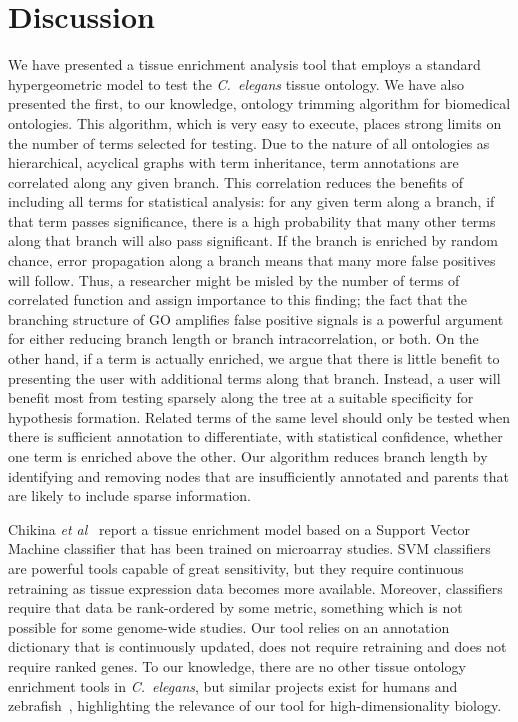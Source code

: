 \documentclass{bmcart}
\begin{document}
\section*{Discussion}
We have presented a tissue enrichment analysis tool that employs a standard hypergeometric model to test the \emph{C.~elegans} tissue ontology. We have also presented the first, to our knowledge, ontology trimming algorithm for biomedical ontologies. This algorithm, which is very easy to execute, places strong limits on the number of terms selected for testing. Due to the nature of all ontologies as hierarchical, acyclical graphs with term inheritance, term annotations are correlated along any given branch. This correlation reduces the benefits of including all terms for statistical analysis: for any given term along a branch, if that term passes significance, there is a high probability that many other terms along that branch will also pass significant. If the branch is enriched by random chance, error propagation along a branch means that many more false positives will follow. Thus, a researcher might be misled by the number of terms of correlated function and assign importance to this finding; the fact that the branching structure of GO amplifies false positive signals is a powerful argument for either reducing branch length or branch intracorrelation, or both. On the other hand, if a term is actually enriched, we argue that there is little benefit to presenting the user with additional terms along that branch. Instead, a user will benefit most from testing sparsely along the tree at a suitable specificity for hypothesis formation. Related terms of the same level should only be tested when there is sufficient annotation to differentiate, with statistical confidence, whether one term is enriched above the other. Our algorithm reduces branch length by identifying and removing nodes that are insufficiently annotated and parents that are likely to include sparse information.

Chikina \emph{et al}~\cite{Chikina2009} report a tissue enrichment model based on a Support Vector Machine classifier that has been trained on microarray studies. SVM classifiers are powerful tools capable of great sensitivity, but they require continuous retraining as tissue expression data becomes more available. Moreover, classifiers require that data be rank-ordered by some metric, something which is not possible for some genome-wide studies. Our tool relies on an annotation dictionary that is continuously updated, does not require retraining and does not require ranked genes. To our knowledge, there are no other tissue ontology enrichment tools in \emph{C.~elegans}, but similar projects exist for humans and zebrafish~\cite{Lee2013, Prykhozhij2013}, highlighting the relevance of our tool for high-dimensionality biology.
\end{document}
